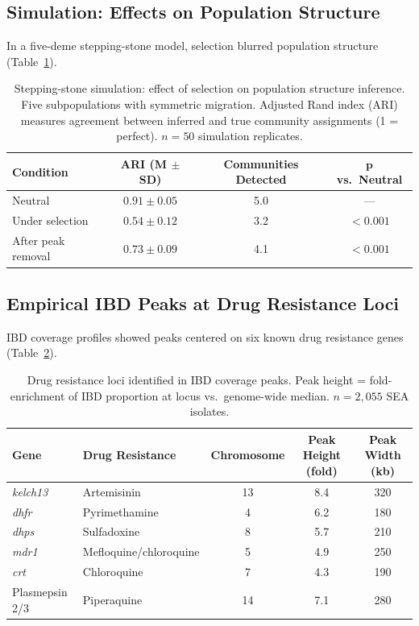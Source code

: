 \documentclass[11pt]{article}
\begin{document}
\subsection{Simulation: Effects on Population Structure}

In a five-deme stepping-stone model, selection blurred population structure (Table~\ref{tab:sim_structure}).

\begin{table}[H]
\centering
\caption{Stepping-stone simulation: effect of selection on population structure inference. Five subpopulations with symmetric migration. Adjusted Rand index (ARI) measures agreement between inferred and true community assignments (1 = perfect). $n = 50$ simulation replicates.}
\label{tab:sim_structure}
\begin{tabular}{lccc}
\toprule
\textbf{Condition} & \textbf{ARI (M $\pm$ SD)} & \textbf{Communities Detected} & $\boldsymbol{p}$ \textbf{vs.\ Neutral} \\
\midrule
Neutral & $0.91 \pm 0.05$ & 5.0 & --- \\
Under selection & $0.54 \pm 0.12$ & 3.2 & $< 0.001$ \\
After peak removal & $0.73 \pm 0.09$ & 4.1 & $< 0.001$ \\
\bottomrule
\end{tabular}
\end{table}

\subsection{Empirical IBD Peaks at Drug Resistance Loci}

IBD coverage profiles showed peaks centered on six known drug resistance genes (Table~\ref{tab:peaks}).

\begin{table}[H]
\centering
\caption{Drug resistance loci identified in IBD coverage peaks. Peak height = fold-enrichment of IBD proportion at locus vs.\ genome-wide median. $n = 2{,}055$ SEA isolates.}
\label{tab:peaks}
\begin{tabular}{llccc}
\toprule
\textbf{Gene} & \textbf{Drug Resistance} & \textbf{Chromosome} & \textbf{Peak Height (fold)} & \textbf{Peak Width (kb)} \\
\midrule
\textit{kelch13} & Artemisinin & 13 & 8.4 & 320 \\
\textit{dhfr} & Pyrimethamine & 4 & 6.2 & 180 \\
\textit{dhps} & Sulfadoxine & 8 & 5.7 & 210 \\
\textit{mdr1} & Mefloquine/chloroquine & 5 & 4.9 & 250 \\
\textit{crt} & Chloroquine & 7 & 4.3 & 190 \\
Plasmepsin 2/3 & Piperaquine & 14 & 7.1 & 280 \\
\bottomrule
\end{tabular}
\end{table}
\end{document}
